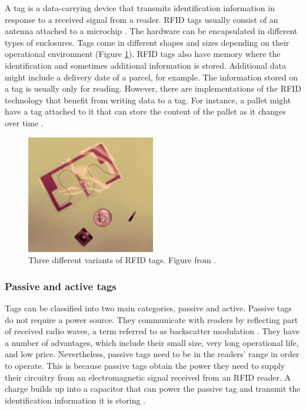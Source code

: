 A tag is a data-carrying device that transmits identification information in response to a received signal from a reader. RFID tags usually consist of an antenna attached to a microchip \cite[p. 2]{Want2006}. The hardware can be encapsulated in different types of enclosures. Tags come in different shapes and sizes depending on their operational environment (Figure \ref{fig:rfidtags}). RFID tags also have memory where the identification and sometimes additional information is stored. Additional data might include a delivery date of a parcel, for example. The information stored on a tag is usually only for reading. However, there are implementations of the RFID technology that benefit from writing data to a tag. For instance, a pallet might have a tag attached to it that can store the content of the pallet as it changes over time \cite[p. 8]{Hunt2007}.

\begin{figure}
	\begin{center}
		\includegraphics[width=0.5\textwidth]{figures/rfidtags}
		\caption{Three different variants of RFID tags. Figure from \cite{Want2006}.}
		\label{fig:rfidtags}
	\end{center}
\end{figure}

\subsubsection{Passive and active tags}

Tags can be classified into two main categories, passive and active. Passive tags do not require a power source. They communicate with readers by reflecting part of received radio waves, a term referred to as backscatter modulation \cite{Bolic2010}. They have a number of advantages, which include their small size, very long operational life, and low price. Nevertheless, passive tags need to be in the readers' range in order to operate. This is because passive tags obtain the power they need to supply their circuitry from an electromagnetic signal received from an RFID reader. A charge builds up into a capacitor that can power the passive tag and transmit the identification information it is storing \cite{Weinstein2005}.

